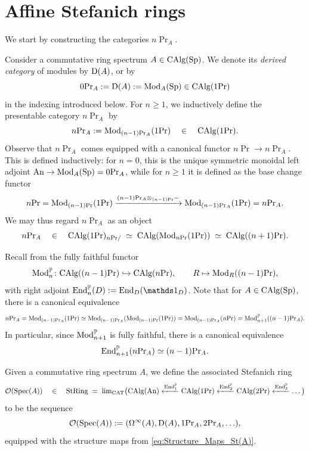 \documentclass[11pt]{book}
\begin{document}
	\section{Affine Stefanich rings}

	We start by constructing the categories $n\Pr_A$.
	
	\begin{definition}
		Consider a commutative ring spectrum $A \in {\textup{CAlg}}({\textup{Sp}})$. We denote its \emph{derived category} of modules by $\operatorname{\mathrm{D}}(A)$, or by
		\[
			0\textup{Pr}_A := \operatorname{\mathrm{D}}(A) := {\textup{Mod}}_A({\textup{Sp}}) \in {\textup{CAlg}}(1\textup{Pr})
		\]
		in the indexing introduced below.
		For $n \geq 1$, we inductively define the presentable category $n\Pr_A$ by
		\[
			n\textup{Pr}_A := {\textup{Mod}}_{(n-1)\textup{Pr}_A}(1\textup{Pr}) \quad\in\quad {\textup{CAlg}}(1\textup{Pr}).
		\]
		Observe that $n\Pr_A$ comes equipped with a canonical functor $n\Pr \to n\Pr_A$. This is defined inductively: for $n = 0$, this is the unique symmetric monoidal left adjoint ${\textup{An}} \to {\textup{Mod}}_A({\textup{Sp}}) = 0\textup{Pr}_A$, while for $n \geq 1$ it is defined as the base change functor
		\[
			n\textup{Pr} = {\textup{Mod}}_{(n-1)\textup{Pr}}(1\textup{Pr}) \xrightarrow{(n-1)\textup{Pr}_A \otimes_{(n-1)\textup{Pr}} -} {\textup{Mod}}_{(n-1)\textup{Pr}_A}(1\textup{Pr}) = n\textup{Pr}_A.
		\]
		We may thus regard $n\Pr_A$ as an object
		\[
			n\textup{Pr}_A \quad\in\quad {\textup{CAlg}}(1\textup{Pr})_{n\textup{Pr}/} \; \simeq \; {\textup{CAlg}}({\textup{Mod}}_{n\textup{Pr}}(1\textup{Pr})) \; \simeq \; {\textup{CAlg}}((n+1)\textup{Pr}).
		\]
	\end{definition}

	\begin{observation}
		Recall from  the fully faithful functor
		\[
			{\textup{Mod}}^{\mathbb{P}}_n\colon {\textup{CAlg}}((n-1)\textup{Pr}) \hookrightarrow {\textup{CAlg}}(n\textup{Pr}), \qquad R \mapsto {\textup{Mod}}_R((n-1)\textup{Pr}),
		\]
		with right adjoint $\End^{\bbP}_n(D) := \End_D(\unit_D)$. Note that for $A \in {\textup{CAlg}}({\textup{Sp}})$, there is a canonical equivalence
		\[
			n\textup{Pr}_A = {\textup{Mod}}_{(n-1)\textup{Pr}_A}(1\textup{Pr}) \simeq {\textup{Mod}}_{(n-1)\textup{Pr}_A}({\textup{Mod}}_{(n-1)\textup{Pr}}(1\textup{Pr})) = {\textup{Mod}}_{(n-1)\textup{Pr}_A}(n\textup{Pr}) = {\textup{Mod}}^{\mathbb{P}}_{n+1}((n-1)\textup{Pr}_A).
		\]
		In particular, since ${\textup{Mod}}^{\mathbb{P}}_{n+1}$ is fully faithful, there is a canonical equivalence
		\begin{equation}
		\label{eq:Structure_Maps_St(A)}
			\operatorname{End}^{\mathbb{P}}_{n+1}(n\textup{Pr}_A) \simeq (n-1)\textup{Pr}_A.
		\end{equation}
	\end{observation}

	\begin{definition}
		Given a commutative ring spectrum $A$, we define the associated Stefanich ring
		\[
			\mathcal{O}(\operatorname{Spec}(A)) \quad\in\quad {\textup{StRing}} \; = \; \operatorname{lim}_{{\textup{CAT}}}\bigl({\textup{CAlg}}({\textup{An}}) \xleftarrow{\operatorname{End}^{\mathbb{P}}_1} {\textup{CAlg}}(1\textup{Pr}) \xleftarrow{\operatorname{End}^{\mathbb{P}}_2} {\textup{CAlg}}(2\textup{Pr}) \xleftarrow{\operatorname{End}^{\mathbb{P}}_3} \dots\bigr)
		\]
		to be the sequence
		\[
			\mathcal{O}(\operatorname{Spec}(A)) := (\Omega^{\infty}(A), \operatorname{\mathrm{D}}(A), 1\textup{Pr}_A, 2\textup{Pr}_A, \ldots),
		\]
		equipped with the structure maps from \eqref{eq:Structure_Maps_St(A)}.
	\end{definition}
\end{document}
